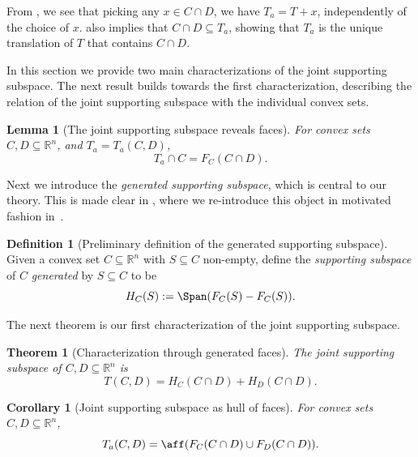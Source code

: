 \documentclass{article}
\theoremstyle{plain}
\newtheorem{theorem}{Theorem}[section]
\newtheorem{corollary}{Corollary}[section]
\newtheorem{lemma}{Lemma}[section]
\theoremstyle{definition}
\newtheorem{definition}{Definition}[section]
\theoremstyle{remark}
\begin{document}
From , we see that picking any $x \in C \cap D$, we have $T_a = T + x$, independently of the choice of $x$.  also implies that
$C \cap D \subseteq T_a$, showing that $T_a$ is the unique translation
of $T$ that contains $C \cap D$.

In this section we provide two main characterizations of the joint supporting subspace.
The next result builds towards the first characterization, describing the
relation of the joint supporting subspace with the individual convex sets.
\begin{lemma}[The joint supporting subspace reveals faces]
\label{loc:the_joint_supporting_subspace_reveals_faces.statement}
For convex sets $C, D \subseteq \mathbb{R}^n$, and $T_a=T_a(C, D)$,
\begin{equation*}
T_a \cap C = F_C (C  \cap D).
\end{equation*}
\end{lemma}
Next we introduce the \emph{generated
supporting subspace}, which is central to our theory. This is made clear
in , where we re-introduce
this object in motivated fashion in~.
\begin{definition}[Preliminary definition of the generated supporting subspace]
\label{loc:generated_supporting_subspace.basic_definition}
Given a convex set $C \subseteq \mathbb{R}^n$ with $S \subseteq C$ non-empty, define the \emph{supporting subspace} of $C$ \emph{generated} by $S \subseteq C$ to be
\begin{equation*}
H_C(S) := \Span(F_C(S) - F_C(S)).
\end{equation*}
\end{definition}
The next theorem is our first characterization of the joint supporting subspace.
\begin{theorem}[Characterization through generated faces]
\label{loc:characterization_through_generated_faces.statement}
The joint supporting subspace of $C, D \subseteq \mathbb{R}^n$ is
\begin{equation*}
T(C, D) = H_C(C \cap D) + H_D(C \cap D).
\end{equation*}
\end{theorem}
\begin{corollary}[Joint supporting subspace as hull of faces]
\label{loc:joint_supporting_subspace_as_affine_hull.statement}
For convex sets $C, D \subseteq \mathbb{R}^n$,
\begin{equation*}
T_a(C, D) = \aff(F_C(C \cap D) \cup F_D(C \cap D)).
\end{equation*}
\end{corollary}
\end{document}
